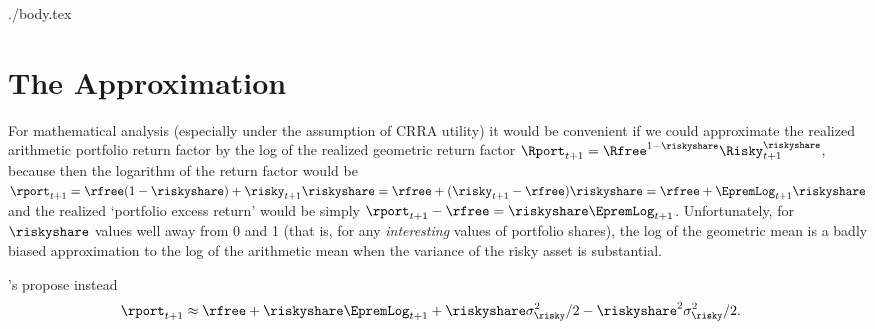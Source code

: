 \documentclass{handout}
\begin{document}
\begin{verbatimwrite}{./body.tex}


\end{verbatimwrite}


\pagebreak\appendix
\section{The \cite{cvAppendix} Approximation}

For mathematical analysis (especially under the assumption of CRRA
utility) it would be convenient if we could approximate the realized
arithmetic portfolio return factor by the log of the realized geometric return
factor $\Rport_{t+1}=\Rfree^{1-\riskyshare}\Risky_{t+1}^{\riskyshare}$,
because then the logarithm of the return factor would be $\rport_{t+1}
= \rfree (1-\riskyshare)+\risky_{t+1}\riskyshare = \rfree +
(\risky_{t+1}-\rfree)\riskyshare = \rfree + \EpremLog_{t+1} \riskyshare$
and the realized `portfolio excess return' would be simply
$\rport_{t+1}-\rfree = \riskyshare\EpremLog_{t+1}$.  Unfortunately, for
$\riskyshare$ values well away from 0 and 1 (that is, for any {\it
  interesting} values of portfolio shares), the log of the geometric mean is a
badly biased approximation to the log of the arithmetic mean when the variance of
the risky asset is substantial.

\cite{cvAppendix}'s propose instead
\begin{equation}\begin{gathered}\begin{aligned}
  \rport_{t+1} & \approx  \rfree+ \riskyshare \EpremLog_{t+1}+\riskyshare \sigma^{2}_{\risky}/2 - \riskyshare^{2}\sigma^{2}_{\risky}/2 .
\end{aligned}\end{gathered}\end{equation}
\end{document}
